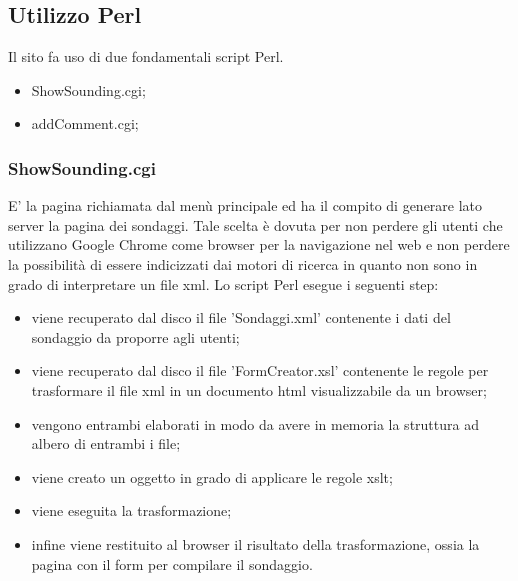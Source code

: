 \documentclass[10pt,a4paper,onecolumn]{article}
\begin{document}
\subsection{Utilizzo Perl}
Il sito fa uso di due fondamentali script Perl.
\begin{itemize}
  \item ShowSounding.cgi;
  \item addComment.cgi;
\end{itemize}

\subsubsection{ShowSounding.cgi}
E' la pagina richiamata dal menù principale ed ha il compito di generare lato server la pagina dei sondaggi. Tale scelta è dovuta per non perdere gli utenti che utilizzano Google Chrome come browser per la navigazione nel web e non perdere la possibilità di essere indicizzati dai motori di ricerca in quanto non sono in grado di interpretare un file xml. Lo script Perl esegue i seguenti step:
\begin{itemize}
	\item viene recuperato dal disco il file 'Sondaggi.xml' contenente i dati del sondaggio da proporre agli utenti;
	\item viene recuperato  dal disco il file 'FormCreator.xsl' contenente le regole per trasformare il file xml in un documento html visualizzabile da un browser;
	\item vengono entrambi elaborati in modo da avere in memoria la struttura ad albero di entrambi i file;
	\item viene creato un oggetto in grado di applicare le regole xslt;
	\item viene eseguita la trasformazione;
	\item infine viene restituito al browser il risultato della trasformazione, ossia la pagina con il form per compilare il sondaggio.
\end{itemize}
\end{document}
